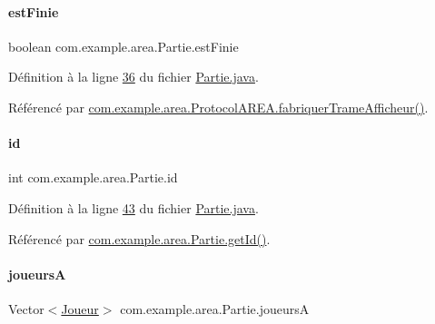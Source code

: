 \paragraph{\texorpdfstring{est\+Finie}{estFinie}}
{\footnotesize\ttfamily boolean com.\+example.\+area.\+Partie.\+est\+Finie\hspace{0.3cm}{\ttfamily [private]}}



Définition à la ligne \hyperlink{_partie_8java_source_l00036}{36} du fichier \hyperlink{_partie_8java_source}{Partie.\+java}.



Référencé par \hyperlink{_protocol_a_r_e_a_8java_source_l00048}{com.\+example.\+area.\+Protocol\+A\+R\+E\+A.\+fabriquer\+Trame\+Afficheur()}.

\mbox{\label{classcom_1_1example_1_1area_1_1_partie_a06ef6dd2585a669a8230ed1217cd98f4}} 
\paragraph{\texorpdfstring{id}{id}}
{\footnotesize\ttfamily int com.\+example.\+area.\+Partie.\+id\hspace{0.3cm}{\ttfamily [private]}}



Définition à la ligne \hyperlink{_partie_8java_source_l00043}{43} du fichier \hyperlink{_partie_8java_source}{Partie.\+java}.



Référencé par \hyperlink{_partie_8java_source_l00112}{com.\+example.\+area.\+Partie.\+get\+Id()}.

\mbox{\label{classcom_1_1example_1_1area_1_1_partie_a190a033a96ec435589ac53f78d60890b}} 
\paragraph{\texorpdfstring{joueursA}{joueursA}}
{\footnotesize\ttfamily Vector$<$\hyperlink{classcom_1_1example_1_1area_1_1_joueur}{Joueur}$>$ com.\+example.\+area.\+Partie.\+joueursA\hspace{0.3cm}{\ttfamily [private]}}



